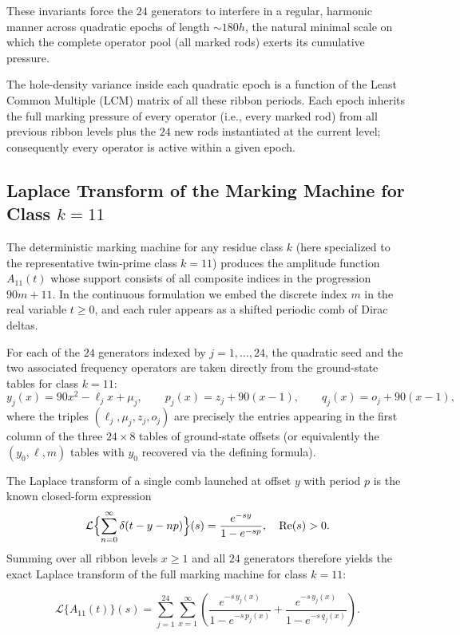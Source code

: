 \documentclass[11pt,a4paper]{article}
\begin{document}
These invariants force the $24$ generators to interfere in a regular, harmonic manner across quadratic epochs of length \(\sim180h\), the natural minimal scale on which the complete operator pool (all marked rods) exerts its cumulative pressure.

The hole-density variance inside each quadratic epoch is a function of the Least Common Multiple (LCM) matrix of all these ribbon periods. Each epoch inherits the full marking pressure of every operator (i.e., every marked rod) from all previous ribbon levels plus the $24$ new rods instantiated at the current level; consequently every operator is active within a given epoch.

\subsection{Laplace Transform of the Marking Machine for Class \(k=11\)}

The deterministic marking machine for any residue class \(k\) (here specialized to the representative twin-prime class \(k=11\)) produces the amplitude function \(A_{11}(t)\) whose support consists of all composite indices in the progression \(90m + 11\). In the continuous formulation we embed the discrete index \(m\) in the real variable \(t \ge 0\), and each ruler appears as a shifted periodic comb of Dirac deltas.

For each of the \(24\) generators indexed by \(j=1,\dots,24\), the quadratic seed and the two associated frequency operators are taken directly from the ground-state tables for class \(k=11\):
\[
y_j(x) = 90x^2 - \ell_j x + \mu_j, \qquad
p_j(x) = z_j + 90(x-1), \qquad
q_j(x) = o_j + 90(x-1),
\]
where the triples \((\ell_j, \mu_j, z_j, o_j)\) are precisely the entries appearing in the first column of the three \(24 \times 8\) tables of ground-state offsets (or equivalently the \((y_0,\ell,m)\) tables with \(y_0\) recovered via the defining formula).

The Laplace transform of a single comb launched at offset \(y\) with period \(p\) is the known closed-form expression
\[
\mathcal{L}\Bigl\{\sum_{n=0}^\infty \delta(t - y - n p)\Bigr\}(s) = \frac{e^{-s y}}{1 - e^{-s p}}, \quad \operatorname{Re}(s) > 0.
\]
Summing over all ribbon levels \(x \ge 1\) and all \(24\) generators therefore yields the exact Laplace transform of the full marking machine for class \(k=11\):

\[
\mathcal{L}\{A_{11}(t)\}(s) = \sum_{j=1}^{24} \sum_{x=1}^\infty \left( \frac{e^{-s\, y_j(x)}}{1 - e^{-s\, p_j(x)}} + \frac{e^{-s\, y_j(x)}}{1 - e^{-s\, q_j(x)}} \right).
\]
\end{document}
